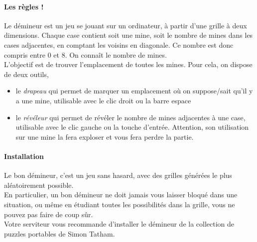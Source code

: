 \signature{Pandada}

\paragraph{Les règles !}
Le démineur est un jeu se jouant sur un ordinateur, à partir d'une grille à deux dimensions. 
Chaque case contient soit une mine, soit le nombre de mines dans les cases adjacentes, en comptant les voisins en diagonale. 
Ce nombre est donc compris entre $0$ et $8$. On connaît le nombre de mines. \\
L'objectif est de trouver l'emplacement de toutes les mines. 
Pour cela, on dispose de deux outils,
\begin{itemize}
	\item le \emph{drapeau} qui permet de marquer un emplacement où on suppose/sait qu'il y a une mine, utilisable avec le clic droit ou la barre espace
	\item le \emph{révéleur} qui permet de révéler le nombre de mines adjacentes à une case, utilisable avec le clic gauche ou la touche d'entrée. Attention, son utilisation sur une mine la fera exploser et vous fera perdre la partie.
\end{itemize}


\paragraph{Installation}
Le bon démineur, c'est un jeu sans hasard, avec des grilles générées le plus aléatoirement possible.\\
En particulier, un bon démineur ne doit jamais vous laisser bloqué dans une situation, ou même en étudiant toutes les possibilités dans la grille, vous ne pouvez pas faire de coup sûr. \\
Votre serviteur vous recommande d'installer le démineur de la collection de puzzles portables de Simon Tatham. 

